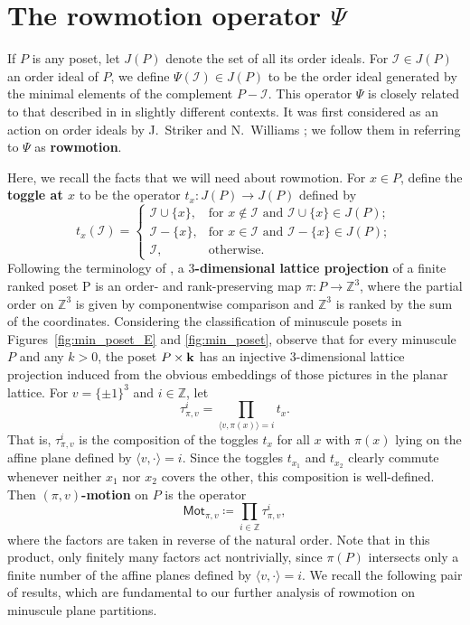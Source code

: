 \documentclass[12pt]{amsart}
\theoremstyle{definition}
\theoremstyle{remark}
\numberwithin{equation}{section}
\newcommand{\mot}{\ensuremath{\mathsf{Mot}}}
\newcommand{\uu}{\mathcal{I}}
\begin{document}
\section{The rowmotion operator $\Psi$}\label{sec:rowmotion}

If $P$ is any poset, let $J(P)$ denote the set of all its order ideals. For $\uu \in J(P)$ an order ideal of $P$, we define $\Psi(\uu) \in J(P)$ to be the order ideal generated by the minimal elements of the complement $P - \uu$. This operator $\Psi$ is closely related to that described in \cite{Brouwer.Schrijver,Duchet,Cameron.Fonderflaass} in slightly different contexts. It was first considered as an action on order ideals by J.~Striker and N.~Williams \cite{Striker.Williams}; we follow them in referring to $\Psi$ as {\bf rowmotion}.

Here, we recall the facts that we will need about rowmotion. For $x \in P$, define the {\bf toggle at $x$} to be the operator $t_x : J(P) \to J(P)$ defined by
\[
t_x(\uu) = \left\{ \begin{array}{ll}
        \uu \cup \{x\}, & \text{for } x \notin \uu \text{ and } \uu \cup \{x\} \in J(P); \\
        \uu - \{x\}, & \text{for } x \in \uu \text{ and } \uu - \{x\} \in J(P);\\
        \uu, & \text{otherwise. }
        \end{array} \right.
\]
Following the terminology of \cite{DPS}, a {\bf $3$-dimensional lattice projection} of a finite ranked poset P is an order- and rank-preserving map $\pi : P \to \mathbb{Z}^3$, where the partial order on $\mathbb{Z}^3$ is given by componentwise comparison and $\mathbb{Z}^3$ is ranked by the sum of the coordinates. Considering the classification of minuscule posets in Figures~\ref{fig:min_poset_E} and \ref{fig:min_poset}, observe that for every minuscule $P$ and any $k > 0$, the poset $P \times {\bf k}$ has an injective $3$-dimensional lattice projection induced from the obvious embeddings of those pictures in the planar lattice. For $v = \{\pm 1 \}^3$ and $i \in \mathbb{Z}$, let 
\begin{equation}\label{eq:taudef}
\tau_{\pi,v}^i = \prod_{\langle v, \pi(x) \rangle = i} t_x.
\end{equation}
That is, $\tau_{\pi,v}^i$ is the composition of the toggles $t_x$ for all $x$ with $\pi(x)$ lying on the affine plane defined by $\langle v, \cdot \rangle = i$. Since the toggles $t_{x_1}$ and $t_{x_2}$ clearly commute whenever neither $x_1$ nor $x_2$ covers the other, this composition is well-defined. Then {\bf  $(\pi, v)$-motion} on $P$ is the operator
\[
\mot_{\pi, v} \coloneqq \prod_{i \in \mathbb{Z}} \tau_{\pi,v}^i,
\]
where the factors are taken in reverse of the natural order. Note that in this product, only finitely many factors act nontrivially, since $\pi(P)$ intersects only a finite number of the affine planes defined by $\langle v, \cdot \rangle = i$. We recall the following pair of results, which are fundamental to our further analysis of rowmotion on minuscule plane partitions.
\end{document}
